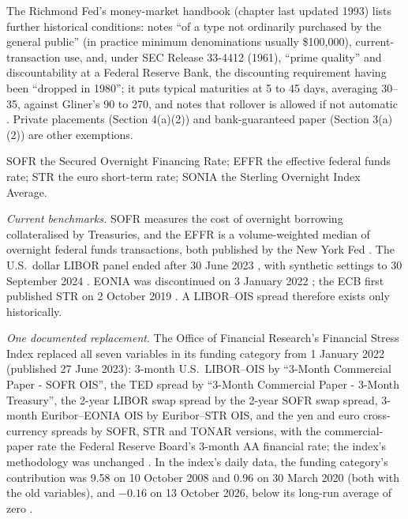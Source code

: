 \begin{qfdefinition}
The Richmond Fed's money-market handbook (chapter last updated 1993) lists further historical conditions: notes ``of a type not ordinarily purchased by the general public'' (in practice minimum denominations usually \$100,000), current-transaction use, and, under SEC Release 33-4412 (1961), ``prime quality'' and discountability at a Federal Reserve Bank, the discounting requirement having been ``dropped in 1980''; it puts typical maturities at 5 to 45 days, averaging 30--35, against Gliner's 90 to 270, and notes that rollover is allowed if not automatic \citep[chap.~9, pp.~105--107 and n.~4]{richmondfed-cp-1993}. Private placements (Section 4(a)(2)) and bank-guaranteed paper (Section 3(a)(2)) are other exemptions.

 SOFR the Secured Overnight Financing Rate; EFFR the effective federal funds rate; \texteuro{}STR the euro short-term rate; SONIA the Sterling Overnight Index Average.

 \emph{Current benchmarks.} SOFR measures the cost of overnight borrowing collateralised by Treasuries, and the EFFR is a volume-weighted median of overnight federal funds transactions, both published by the New York Fed \citep[SOFR description; EFFR and OBFR methodology]{exp-sofr-data}. The U.S.\ dollar LIBOR panel ended after 30 June 2023 \citep[web page]{arrc-sofr-transition}, with synthetic settings to 30 September 2024 \citep[sec.~2, n.~11]{cbot-23-214}. EONIA was discontinued on 3 January 2022 \citep[web page]{emmi-eonia}; the ECB first published \texteuro{}STR on 2 October 2019 \citep[web page]{ecb-estr}. A LIBOR--OIS spread therefore exists only historically.

\emph{One documented replacement}. The Office of Financial Research's Financial Stress Index replaced all seven variables in its funding category from 1 January 2022 (published 27 June 2023): 3-month U.S.\ LIBOR--OIS by ``3-Month Commercial Paper - SOFR OIS'', the TED spread by ``3-Month Commercial Paper - 3-Month Treasury'', the 2-year LIBOR swap spread by the 2-year SOFR swap spread, 3-month Euribor--EONIA OIS by Euribor--\texteuro{}STR OIS, and the yen and euro cross-currency spreads by SOFR, \texteuro{}STR and TONAR versions, with the commercial-paper rate the Federal Reserve Board's 3-month AA financial rate; the index's methodology was unchanged \citep[pp.~1--2, Tables~1--2]{ofr-fsi-factsheet-2023}. In the index's daily data, the funding category's contribution was 9.58 on 10 October 2008 and 0.96 on 30 March 2020 (both with the old variables), and $-0.16$ on 13 October 2026, below its long-run average of zero \citep[\texttt{fsi.csv}]{ofr-fsi-data}.


\end{qfdefinition}
